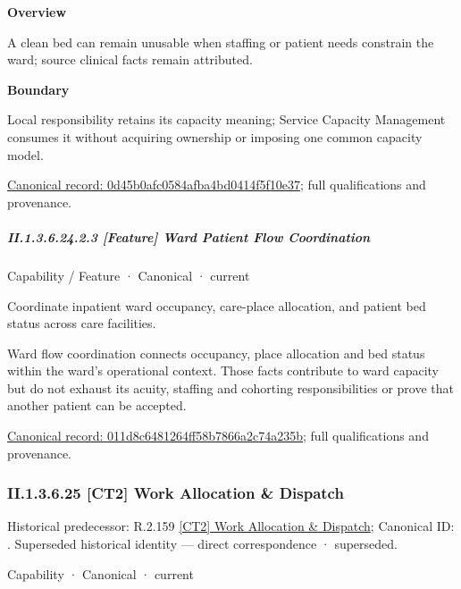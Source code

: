 \textbf{Overview}



A clean bed can remain unusable when staffing or patient needs constrain the ward; source clinical facts remain attributed.



\textbf{Boundary}



Local responsibility retains its capacity meaning; Service Capacity Management consumes it without acquiring ownership or imposing one common capacity model.


{\footnotesize \href{../../../../continuum/strategy/capability/feature/0d45b0afc0584afba4bd0414f5f10e37.md}{Canonical record: 0d45b0afc0584afba4bd0414f5f10e37}; full qualifications and provenance.}\par
\subparagraph*{II.1.3.6.24.2.3 [Feature] Ward Patient Flow Coordination}
\label{navigation:II.1.3.6.24.2.3}

\label{element:011d8c6481264ff58b7866a2c74a235b}
{\small Capability / Feature · Canonical · current}\par

Coordinate inpatient ward occupancy, care-place allocation, and patient bed status across care facilities.



Ward flow coordination connects occupancy, place allocation and bed status within the ward's operational context. Those facts contribute to ward capacity but do not exhaust its acuity, staffing and cohorting responsibilities or prove that another patient can be accepted.


{\footnotesize \href{../../../../continuum/strategy/capability/feature/011d8c6481264ff58b7866a2c74a235b.md}{Canonical record: 011d8c6481264ff58b7866a2c74a235b}; full qualifications and provenance.}\par
\subsubsection*{II.1.3.6.25 [CT2] Work Allocation \& Dispatch}
\label{navigation:II.1.3.6.25}

{\small Historical predecessor: R.2.159 \hyperref[element:f8c13b6f74b840cc96fbeada5865455a]{[CT2] Work Allocation \& Dispatch}; Canonical ID: \texttt{}. Superseded historical identity — direct correspondence · superseded.}\par
\label{element:152a5252952c405994e9b171234efcb0}
{\small Capability · Canonical · current}\par


